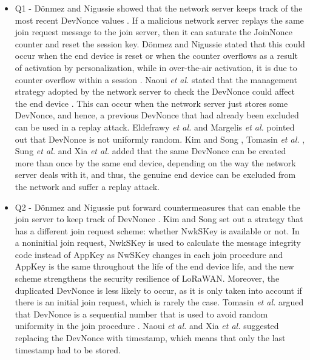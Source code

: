 \documentclass[manuscript,screen,review=false]{acmart}
\begin{document}
\begin{itemize}
\item Q1 - D\"onmez and Nigussie showed that the network server keeps track of the most recent DevNonce values \cite{02_security_procedure_LoRaWANv1.1}. If a malicious network server replays the same join request message to the join server, then it can saturate the JoinNonce counter and reset the session key. D\"onmez and Nigussie stated that this could occur when the end device is reset or when the counter overflows as a result of activation by personalization, while in over-the-air activation, it is due to counter overflow within a session \cite{03_security_LoRaWANv1.1_scenarios}. Naoui {\it et al.} stated that the management strategy adopted by the network server to check the DevNonce could affect the end device \cite{35_third_party_key_management}. This can occur when the network server just stores some DevNonce, and hence, a previous DevNonce that had already been excluded can be used in a replay attack.
Eldefrawy {\it et al.} \cite{01_formal_security_analysis_LoRaWAN} and Margelis {\it et al.} \cite{70_low_throughput_networks_IoT} pointed out that DevNonce is not uniformly random. Kim and Song \cite{21_analysis_LoRaWAN_v1.1_security}, Tomasin {\it et al.} \cite{34_lorawan_join_procedure}, Sung {\it et al.} \cite{45_protecting_end_device} and Xia {\it et al.} \cite{56_session_key_management} added that the same DevNonce can be created more than once by the same end device, depending on the way the network server deals with it, and thus, the genuine end device can be excluded from the network and suffer a replay attack.


\item Q2 - D\"onmez and Nigussie put forward countermeasures that can enable the join server to keep track of DevNonce \cite{02_security_procedure_LoRaWANv1.1}. Kim and Song \cite{21_analysis_LoRaWAN_v1.1_security} set out a strategy that has a different join request scheme: whether NwkSKey is available or not. In a noninitial join request, NwkSKey is used to calculate the message integrity code instead of AppKey as NwSKey changes in each join procedure and AppKey is the same throughout the life of the end device life, and the new scheme strengthens the security resilience of LoRaWAN. Moreover, the duplicated DevNonce is less likely to occur, as it is only taken into account if there is an initial join request, which is rarely the case. Tomasin {\it et al.} argued that DevNonce is a sequential number that is used to avoid random uniformity in the join procedure \cite{34_lorawan_join_procedure}. Naoui {\it et al.} \cite{35_third_party_key_management} and Xia {\it et al.} \cite{56_session_key_management} suggested replacing the DevNonce with timestamp, which means that only the last timestamp had to be stored.


\end{itemize}
\end{document}
